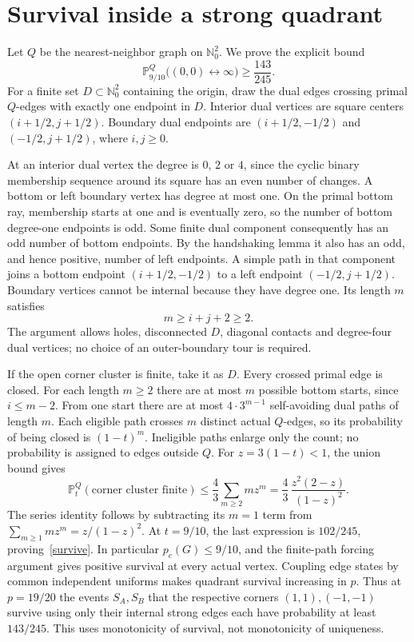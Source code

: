 \documentclass[11pt]{article}
\theoremstyle{definition}
\newcommand{\PP}{\mathbb P}
\newcommand{\NN}{\mathbb N}
\begin{document}
\section{Survival inside a strong quadrant}
Let $Q$ be the nearest-neighbor graph on $\NN_0^2$.
We prove the explicit bound
\begin{equation}\label{survive}
 \PP_{9/10}^Q\bigl((0,0)\leftrightarrow\infty\bigr)\geq\frac{143}{245}.
\end{equation}
For a finite set $D\subset\NN_0^2$ containing the origin, draw the dual
edges crossing primal $Q$-edges with exactly one endpoint in $D$.
Interior dual vertices are square centers $(i+1/2,j+1/2)$.
Boundary dual endpoints are $(i+1/2,-1/2)$ and $(-1/2,j+1/2)$,
where $i,j\geq0$.

At an interior dual vertex the degree is $0$, $2$ or $4$, since the cyclic
binary membership sequence around its square has an even number of changes.
A bottom or left boundary vertex has degree at most one.
On the primal bottom ray, membership starts at one and is eventually zero,
so the number of bottom degree-one endpoints is odd. Some finite dual
component consequently has an odd number of bottom endpoints. By the
handshaking lemma it also has an odd, and hence positive, number of left
endpoints. A simple path in that component joins a bottom endpoint
$(i+1/2,-1/2)$ to a left endpoint $(-1/2,j+1/2)$.
Boundary vertices cannot be internal because they have degree one.
Its length $m$ satisfies
\[
 m\geq i+j+2\geq2.
\]
The argument allows holes, disconnected $D$, diagonal contacts and degree-four
dual vertices; no choice of an outer-boundary tour is required.

If the open corner cluster is finite, take it as $D$. Every crossed primal
edge is closed. For each length $m\geq2$ there are at most $m$ possible
bottom starts, since $i\leq m-2$. From one start there are at most
$4\cdot3^{m-1}$ self-avoiding dual paths of length $m$.
Each eligible path crosses $m$ distinct actual $Q$-edges, so its probability
of being closed is $(1-t)^m$. Ineligible paths enlarge only the count;
no probability is assigned to edges outside $Q$.
For $z=3(1-t)<1$, the union bound gives
\begin{equation}\label{peierls}
 \PP_t^Q(\text{corner cluster finite})
 \leq\frac43\sum_{m\geq2}m z^m
 =\frac43\,\frac{z^2(2-z)}{(1-z)^2}.
\end{equation}
The series identity follows by subtracting its $m=1$ term from
$\sum_{m\geq1}m z^m=z/(1-z)^2$.
At $t=9/10$, the last expression is $102/245$, proving~\eqref{survive}.
In particular $p_c(G)\leq9/10$, and the finite-path forcing argument
gives positive survival at every actual vertex. Coupling edge states
by common independent uniforms makes quadrant survival increasing in $p$.
Thus at $p=19/20$ the events $S_A,S_B$ that the respective corners
$(1,1),(-1,-1)$ survive using only their internal strong edges each have
probability at least $143/245$. This uses monotonicity of survival,
not monotonicity of uniqueness.
\end{document}
